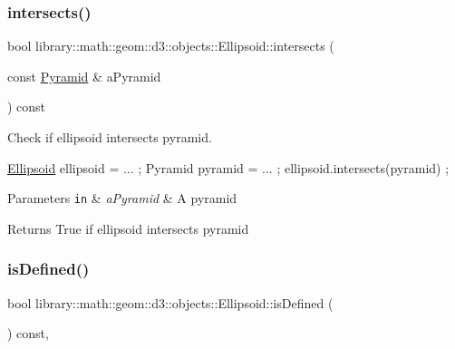 \subsubsection{\texorpdfstring{intersects()}{intersects()}\hspace{0.1cm}{\footnotesize\ttfamily [9/9]}}
{\footnotesize\ttfamily bool library\+::math\+::geom\+::d3\+::objects\+::\+Ellipsoid\+::intersects (\begin{DoxyParamCaption}\item[{const \hyperlink{classlibrary_1_1math_1_1geom_1_1d3_1_1objects_1_1_pyramid}{Pyramid} \&}]{a\+Pyramid }\end{DoxyParamCaption}) const}



Check if ellipsoid intersects pyramid. 


\begin{DoxyCode}
\hyperlink{classlibrary_1_1math_1_1geom_1_1d3_1_1objects_1_1_ellipsoid_aae81fe0edc7f0e8d4590ea89ae73cb14}{Ellipsoid} ellipsoid = ... ;
Pyramid pyramid = ... ;
ellipsoid.intersects(pyramid) ;
\end{DoxyCode}



\begin{DoxyParams}[1]{Parameters}
\mbox{\tt in}  & {\em a\+Pyramid} & A pyramid \\
\hline
\end{DoxyParams}
\begin{DoxyReturn}{Returns}
True if ellipsoid intersects pyramid 
\end{DoxyReturn}
\mbox{\label{classlibrary_1_1math_1_1geom_1_1d3_1_1objects_1_1_ellipsoid_adb42c2c7734c27dcb16d947fc5c9d76d}} 
\subsubsection{\texorpdfstring{is\+Defined()}{isDefined()}}
{\footnotesize\ttfamily bool library\+::math\+::geom\+::d3\+::objects\+::\+Ellipsoid\+::is\+Defined (\begin{DoxyParamCaption}{ }\end{DoxyParamCaption}) const\hspace{0.3cm}{\ttfamily [override]}, {\ttfamily [virtual]}}



